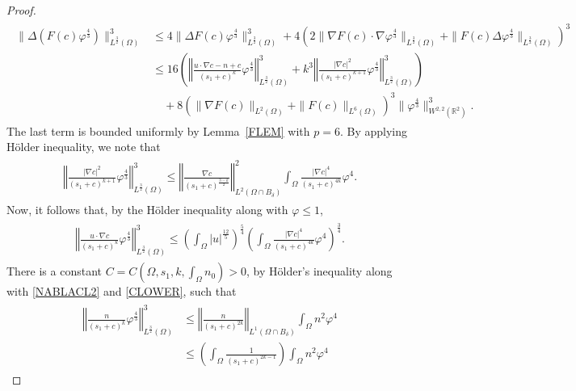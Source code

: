 \documentclass{amsart}
\numberwithin{equation}{section}
\newcommand{\R}{{ \mathbb{R}  }}
\newcommand{\bke}[1]{\left( #1 \right)}
\newcommand{\norm}[1]{\left\Vert #1 \right\Vert}
\begin{document}
\begin{proof}
\begin{align*}
\begin{aligned}
\|  \Delta(F(c)   \varphi^{\frac{4}{3}})  \|_{L^{\frac{3}{2}}(\Omega)}^{3}
&\le 4\| \Delta F(c)   \varphi^{\frac{4}{3}}   \|_{L^{\frac{3}{2}}(\Omega)}^{3}
    +4 \left( 2\| \nabla F(c) \cdot \nabla \varphi^{\frac{4}{3}}\|_{L^{\frac{3}{2}}(\Omega)}+\| F( c)  \Delta \varphi^{\frac{4}{3}}   \|_{L^{\frac{3}{2}}(\Omega)}\right)^{3}
\\
&\le  16\bke{\norm{\frac{ u\cdot \nabla c-n+c  }{(s_{1}+c)^{k}}  \varphi^{\frac{4}{3}}   }_{L^{\frac{3}{2}}(\Omega)}^{3}
+  k^{3}\norm{ \frac{|\nabla c|^{2}}{(s_{1}+c)^{k+1}}      \varphi^{\frac{4}{3}}   }_{L^{\frac{3}{2}}(\Omega)}^{3}} 
\\&\quad+ 8\left( \|\nabla F(c)  \|_{L^{2}(\Omega )} +\|F(c)\|_{L^{6}(\Omega)} \right)^{3} \|\varphi^{\frac{4}{3}}\|^{3}_{W^{2,2}(\R^{2})}  .
\end{aligned}
\end{align*}
The last term is bounded uniformly by Lemma~\ref{FLEM} with $p=6$.
By applying H\"{o}lder inequality, we note that 
\begin{align*}
\begin{aligned}
\norm{ \frac{|\nabla c|^{2}}{(s_{1}+c)^{k+1}}      \varphi^{\frac{4}{3}}   }_{L^{\frac{3}{2}}(\Omega)}^{3}  \le \norm{\frac{\nabla c}{(s_{1}+c)^{\frac{3-k}{2}}}}_{L^{2}(\Omega\cap B_{\delta})}^{2}  \int_{\Omega} \frac{|\nabla c|^{4}}{(s_{1}+c)^{4k}}\varphi^{4}. 
\end{aligned}
\end{align*}
Now, it follows that, by the H\"{o}lder inequality along with $ \varphi \le 1$, 
\begin{align*}
\begin{aligned}
\norm{\frac{ u\cdot \nabla c  }{(s_{1}+c)^{k}}  \varphi^{\frac{4}{3}}   }_{L^{\frac{3}{2}}(\Omega)}^{3}
\le \bke{\int_{\Omega}|u|^{\frac{12}{5}} }^{\frac{5}{4}}\bke{\int_{\Omega} \frac{|\nabla c|^{4}}{(s_{1}+c)^{4k}}\varphi^{4}}^{\frac{3}{4}}.
\end{aligned}
\end{align*}
There is a constant $C=C(\Omega, s_1, k, \int_{\Omega}n_0)>0$, by H\"older's inequality along with \eqref{NABLACL2} and \eqref{CLOWER}, such that 
\begin{align*}
\begin{aligned}
\norm{ \frac{ n }{(s_{1}+c)^{k}}  \varphi^{\frac{4}{3}}   }_{L^{\frac{3}{2}}(\Omega)}^{3} 
&\le  \norm{\frac{n}{(s_{1}+c)^{2k}}}_{L^{1}( \Omega \cap B_{\delta} )}\int_{\Omega}n^{2}\varphi^{4} 
\\&  \le \left(\int_{\Omega} \frac{1}{(s_{1}+c)^{2k-1}} \right) \int_{\Omega}n^{2}\varphi^{4} 

\end{aligned}
\end{align*}
\end{proof}
\end{document}
